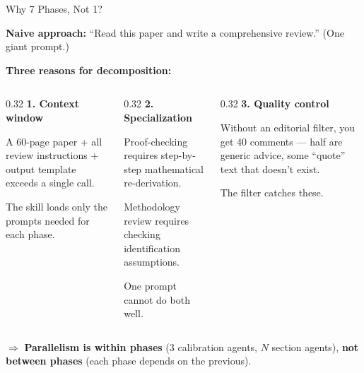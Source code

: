\documentclass[10pt,english,aspectratio=169]{beamer}
\begin{document}
\begin{frame}{Why 7 Phases, Not 1?}

\textbf{Naive approach:} ``Read this paper and write a comprehensive review.'' (One giant prompt.)

\vspace{0.4cm}
\textbf{Three reasons for decomposition:}

\vspace{0.2cm}
\begin{columns}[T]
\begin{column}{0.32\textwidth}
\textbf{1. Context window}

A 60-page paper + all review instructions + output template exceeds a single call.

The skill loads only the prompts needed for each phase.
\end{column}

\begin{column}{0.32\textwidth}
\textbf{2. Specialization}

Proof-checking requires step-by-step mathematical re-derivation.

Methodology review requires checking identification assumptions.

One prompt cannot do both well.
\end{column}

\begin{column}{0.32\textwidth}
\textbf{3. Quality control}

Without an editorial filter, you get 40 comments --- half are generic advice, some ``quote'' text that doesn't exist.

The filter catches these.
\end{column}
\end{columns}

\vspace{0.4cm}
$\Rightarrow$ \textbf{Parallelism is within phases} (3 calibration agents, $N$ section agents), \textbf{not between phases} (each phase depends on the previous).

\end{frame}
\end{document}
